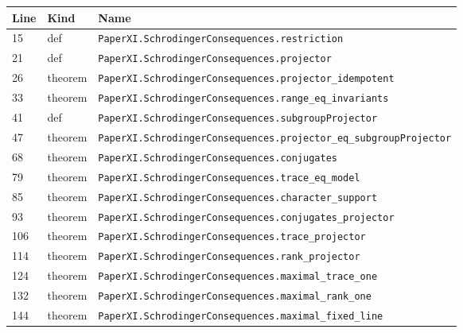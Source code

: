 \documentclass[10pt,oneside]{book}
\begin{document}
\begin{longtable}{@{}p{}p{}p{}@{}}\toprule Line&Kind&Name\\\midrule\endhead

15&def&\nolinkurl{PaperXI.SchrodingerConsequences.restriction}\\

21&def&\nolinkurl{PaperXI.SchrodingerConsequences.projector}\\

26&theorem&\nolinkurl{PaperXI.SchrodingerConsequences.projector_idempotent}\\

33&theorem&\nolinkurl{PaperXI.SchrodingerConsequences.range_eq_invariants}\\

41&def&\nolinkurl{PaperXI.SchrodingerConsequences.subgroupProjector}\\

47&theorem&\nolinkurl{PaperXI.SchrodingerConsequences.projector_eq_subgroupProjector}\\

68&theorem&\nolinkurl{PaperXI.SchrodingerConsequences.conjugates}\\

79&theorem&\nolinkurl{PaperXI.SchrodingerConsequences.trace_eq_model}\\

85&theorem&\nolinkurl{PaperXI.SchrodingerConsequences.character_support}\\

93&theorem&\nolinkurl{PaperXI.SchrodingerConsequences.conjugates_projector}\\

106&theorem&\nolinkurl{PaperXI.SchrodingerConsequences.trace_projector}\\

114&theorem&\nolinkurl{PaperXI.SchrodingerConsequences.rank_projector}\\

124&theorem&\nolinkurl{PaperXI.SchrodingerConsequences.maximal_trace_one}\\

132&theorem&\nolinkurl{PaperXI.SchrodingerConsequences.maximal_rank_one}\\

144&theorem&\nolinkurl{PaperXI.SchrodingerConsequences.maximal_fixed_line}\\

\bottomrule\end{longtable}
\end{document}
